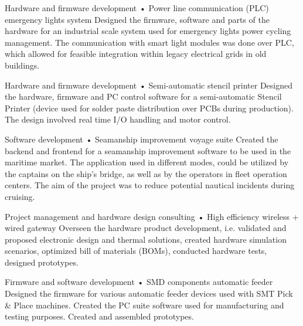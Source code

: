 \documentclass{tccv}
\begin{document}
\begin{yearlist}
\item[Hardware and firmware development]{•}
     {Power line communication (PLC) emergency lights system}
     {Designed the firmware, software and parts of the hardware for an industrial scale system used for emergency lights power cycling management. The communication with smart light modules was done over PLC, which allowed for feasible integration within legacy electrical grids in old buildings.}   
     
\item[Hardware and firmware development]{•}
     {Semi-automatic stencil printer}
     {Designed the hardware, firmware and PC control software for a semi-automatic Stencil Printer (device used for solder paste distribution over PCBs during production). The design involved real time I/O handling and motor control.}
     
\item[Software development]{•}
     {Seamanship improvement voyage suite}
     {Created the backend and frontend for a seamanship improvement software to be used in the maritime market. The application used in different modes, could be utilized by the captains on the ship's bridge, as well as by the operators in fleet operation centers. The aim of the project was to reduce potential nautical incidents during cruising.}        
     
\item[Project management and hardware design consulting]{•}
     {High efficiency wireless + wired gateway}
     {Overseen the hardware product development, i.e. validated and proposed electronic design and thermal solutions, created hardware simulation scenarios, optimized bill of materials (BOMs), conducted hardware tests, designed prototypes.}             

\item[Firmware and software development]{•}
     {SMD components automatic feeder}
     {Designed the firmware for various automatic feeder devices used with SMT Pick \& Place machines. Created the PC suite software used for manufacturing and testing purposes. Created and assembled prototypes.}

\end{yearlist}
\end{document}
